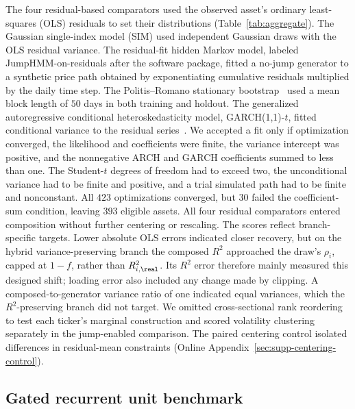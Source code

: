 The four residual-based comparators used the observed asset's
ordinary least-squares (OLS) residuals to set their distributions
(Table~\ref{tab:aggregate}). The Gaussian single-index model (SIM)
used independent Gaussian draws with the OLS residual variance. The
residual-fit hidden Markov model, labeled JumpHMM-on-residuals after
the software package, fitted a no-jump generator to a synthetic price
path obtained by exponentiating cumulative residuals multiplied by
the daily time step. The
Politis--Romano stationary bootstrap~\cite{politisRomano1994} used a
mean block length of $50$ days in both training and holdout. The
generalized autoregressive conditional heteroskedasticity model,
GARCH(1,1)-$t$, fitted conditional variance to the residual
series~\cite{bollerslev1986}. We accepted a fit only if optimization
converged, the likelihood and coefficients were finite, the variance
intercept was positive, and the nonnegative ARCH and GARCH
coefficients summed to less than one. The Student-$t$ degrees of
freedom had to exceed two, the unconditional variance had to be finite
and positive, and a trial simulated path had to be finite and
nonconstant. All $423$ optimizations converged, but $30$ failed the
coefficient-sum condition, leaving $393$ eligible assets. All four residual
comparators entered composition without further centering or
rescaling.
The scores reflect branch-specific targets. Lower absolute OLS errors indicated closer
recovery, but on the hybrid variance-preserving branch the composed
$R^2$ approached the draw's $\rho_i$, capped at $1-f$, rather than
$R^2_{i,\real}$. Its $R^2$ error therefore mainly measured this
designed shift; loading error also included any change made by
clipping. A composed-to-generator variance ratio of one indicated
equal variances, which the $R^2$-preserving branch did not target.
 We omitted cross-sectional
rank reordering to test each ticker's marginal construction and
scored volatility clustering separately in the jump-enabled comparison.
The paired centering control isolated differences in residual-mean
constraints (Online Appendix~\ref{sec:supp-centering-control}).

\subsection{Gated recurrent unit benchmark}
\label{sec:supp-gru}

